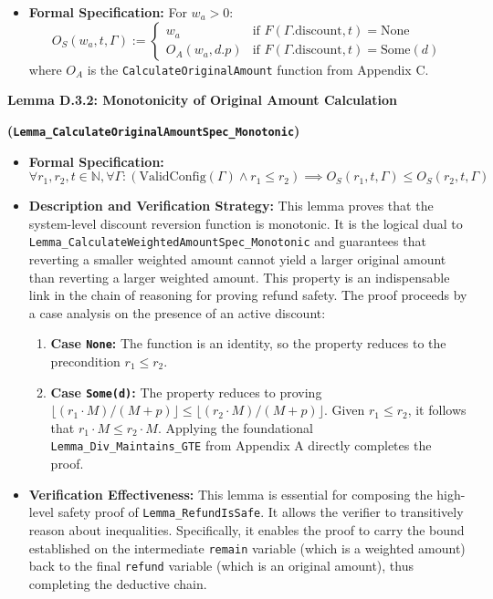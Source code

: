 \documentclass[
  english,
  onecolumn]{article}
\providecommand{\tightlist}{%
  \setlength{\itemsep}{0pt}\setlength{\parskip}{0pt}}
\begin{document}
\begin{itemize}
\tightlist
\item
  \textbf{Formal Specification:} For \(w_a > 0\): \[
  O_S(w_a, t, \Gamma) := \begin{cases}
  w_a & \text{if } F(\Gamma.\text{discount}, t) = \text{None} \\
  O_A(w_a, d.p) & \text{if } F(\Gamma.\text{discount}, t) = \text{Some}(d)
  \end{cases}
  \] where \(O_A\) is the \texttt{CalculateOriginalAmount} function from
  Appendix C.
\end{itemize}

\textbf{Lemma D.3.2: Monotonicity of Original Amount Calculation}

\textbf{(\texttt{Lemma\_CalculateOriginalAmountSpec\_Monotonic})}

\begin{itemize}
\tightlist
\item
  \textbf{Formal Specification:} \[
  \forall r_1, r_2, t \in \mathbb{N}, \forall \Gamma : (\text{ValidConfig}(\Gamma) \land r_1 \le r_2) \implies O_S(r_1, t, \Gamma) \le O_S(r_2, t, \Gamma)
  \]
\item
  \textbf{Description and Verification Strategy:} This lemma proves that
  the system-level discount reversion function is monotonic. It is the
  logical dual to \texttt{Lemma\_CalculateWeightedAmountSpec\_Monotonic}
  and guarantees that reverting a smaller weighted amount cannot yield a
  larger original amount than reverting a larger weighted amount. This
  property is an indispensable link in the chain of reasoning for
  proving refund safety. The proof proceeds by a case analysis on the
  presence of an active discount:

  \begin{enumerate}
  \def\labelenumi{\arabic{enumi}.}
  \tightlist
  \item
    \textbf{Case \texttt{None}:} The function is an identity, so the
    property reduces to the precondition \(r_1 \le r_2\).
  \item
    \textbf{Case \texttt{Some(d)}:} The property reduces to proving
    \(\lfloor(r_1 \cdot M)/(M+p)\rfloor \le \lfloor(r_2 \cdot M)/(M+p)\rfloor\).
    Given \(r_1 \le r_2\), it follows that
    \(r_1 \cdot M \le r_2 \cdot M\). Applying the foundational
    \texttt{Lemma\_Div\_Maintains\_GTE} from Appendix A directly
    completes the proof.
  \end{enumerate}
\item
  \textbf{Verification Effectiveness:} This lemma is essential for
  composing the high-level safety proof of \texttt{Lemma\_RefundIsSafe}.
  It allows the verifier to transitively reason about inequalities.
  Specifically, it enables the proof to carry the bound established on
  the intermediate \texttt{remain} variable (which is a weighted amount)
  back to the final \texttt{refund} variable (which is an original
  amount), thus completing the deductive chain.
\end{itemize}
\end{document}
